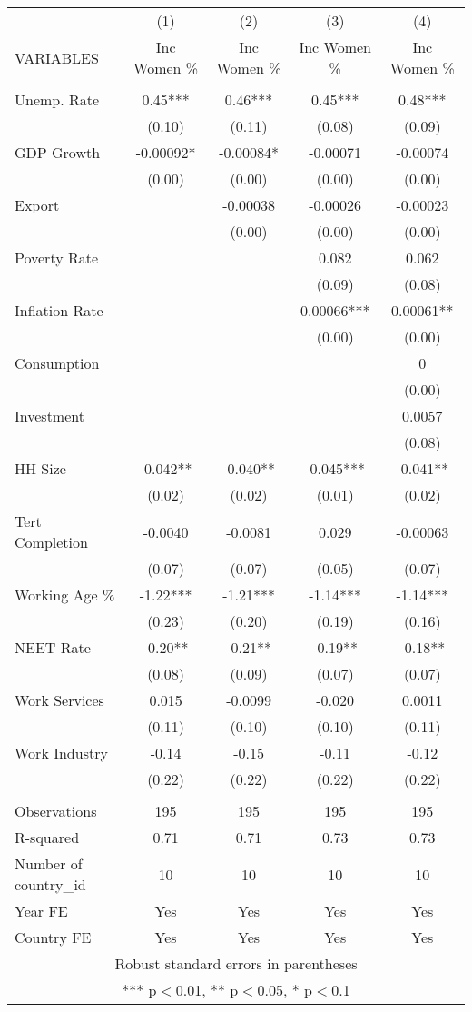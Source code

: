 \documentclass[]{article}
\begin{document}
\begin{tabular}{lcccc} \hline
 & (1) & (2) & (3) & (4) \\
VARIABLES & Inc Women \% & Inc Women \% & Inc Women \% & Inc Women \% \\ \hline
 &  &  &  &  \\
Unemp. Rate & 0.45*** & 0.46*** & 0.45*** & 0.48*** \\
 & (0.10) & (0.11) & (0.08) & (0.09) \\
GDP Growth & -0.00092* & -0.00084* & -0.00071 & -0.00074 \\
 & (0.00) & (0.00) & (0.00) & (0.00) \\
Export &  & -0.00038 & -0.00026 & -0.00023 \\
 &  & (0.00) & (0.00) & (0.00) \\
Poverty Rate &  &  & 0.082 & 0.062 \\
 &  &  & (0.09) & (0.08) \\
Inflation Rate &  &  & 0.00066*** & 0.00061** \\
 &  &  & (0.00) & (0.00) \\
Consumption &  &  &  & 0 \\
 &  &  &  & (0.00) \\
Investment &  &  &  & 0.0057 \\
 &  &  &  & (0.08) \\
HH Size & -0.042** & -0.040** & -0.045*** & -0.041** \\
 & (0.02) & (0.02) & (0.01) & (0.02) \\
Tert Completion & -0.0040 & -0.0081 & 0.029 & -0.00063 \\
 & (0.07) & (0.07) & (0.05) & (0.07) \\
Working Age \% & -1.22*** & -1.21*** & -1.14*** & -1.14*** \\
 & (0.23) & (0.20) & (0.19) & (0.16) \\
NEET Rate & -0.20** & -0.21** & -0.19** & -0.18** \\
 & (0.08) & (0.09) & (0.07) & (0.07) \\
Work Services & 0.015 & -0.0099 & -0.020 & 0.0011 \\
 & (0.11) & (0.10) & (0.10) & (0.11) \\
Work Industry & -0.14 & -0.15 & -0.11 & -0.12 \\
 & (0.22) & (0.22) & (0.22) & (0.22) \\
 &  &  &  &  \\
Observations & 195 & 195 & 195 & 195 \\
R-squared & 0.71 & 0.71 & 0.73 & 0.73 \\
Number of country\_id & 10 & 10 & 10 & 10 \\
Year FE & Yes & Yes & Yes & Yes \\
 Country FE & Yes & Yes & Yes & Yes \\ \hline
\multicolumn{5}{c}{ Robust standard errors in parentheses} \\
\multicolumn{5}{c}{ *** p$<$0.01, ** p$<$0.05, * p$<$0.1} \\
\end{tabular}
\end{document}

